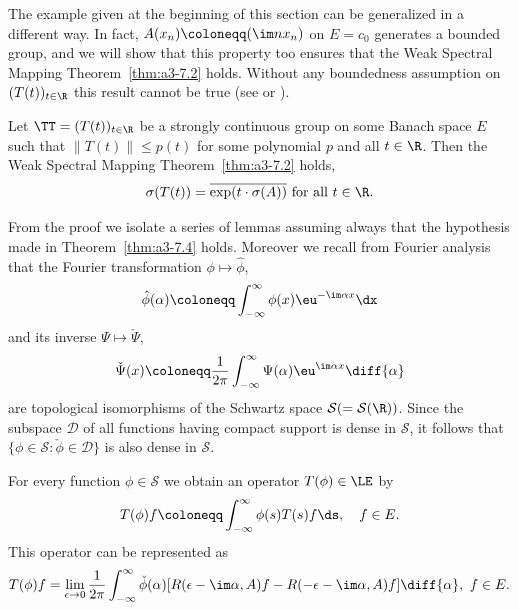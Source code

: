 The example given at the beginning of this section can be generalized in a different way.
In fact, $A(x_{n}) \coloneqq (\im nx_{n})$ on $E = c_{0}$ generates a bounded group, and we will show that this property too ensures that the Weak Spectral Mapping Theorem~\ref{thm:a3-7.2} holds.
Without any boundedness assumption on $(T(t))_{t\in\R}$ this result cannot be true (see \textcite[Sec.23.16]{hillephillips:1957} or \textcite{wolff:1981}).
\begin{theorem}\label{thm:a3-7.4}
Let $\TT = (T(t))_{t\in\R}$ be a strongly continuous group on some Banach space $E$ such that $\|T(t)\| \leq p(t)$ for some polynomial $p$ and all $t \in \R$.
Then the Weak Spectral Mapping Theorem~\ref{thm:a3-7.2} holds, \ie 
\[
\sigma(T(t)) = \overline{\exp(t\cdot\sigma(A))} \text{ for all } t \in \R .
\]
\end{theorem}
From the proof we isolate a series of lemmas assuming always that the hypothesis made in Theorem~\ref{thm:a3-7.4} holds.
Moreover we recall from Fourier analysis that the Fourier transformation $\phi \mapsto \hat{\phi}$,
\[
\hat{\phi}(\alpha) \coloneqq \int_{-\infty}^{\infty} \phi(x)\eu^{-\im\alpha x} \dx
\]
and its inverse $\Psi \mapsto \check{\Psi}$,
\[
\check{\Psi}(x) \coloneqq \frac{1}{2\pi}\int_{-\infty}^{\infty}\Psi(\alpha)\eu^{\im\alpha x} 		\diff{\alpha}
\]
are topological isomorphisms of the Schwartz space $\mathcal{S} ( = \mathcal{S}(\R))$.
Since the subspace $\mathcal{D}$ of all functions having compact support is dense in $\mathcal{S}$, it follows that $\{\phi \in \mathcal{S} \colon \check{\phi} \in \mathcal{D}\}$ is also dense in $\mathcal{S}$.
\begin{lemma}\label{lem:a3-7.5}
For every function $\phi \in \mathcal{S}$ we obtain an operator $T(\phi) \in \LE$ by
\[
T(\phi)f \coloneqq \int_{-\infty}^{\infty} \phi(s)T(s)f \ds, \quad f \in E .
\]
This operator can be represented as
\begin{equation}\label{eq:a3-7.3}
T(\phi)f = \lim_{\epsilon\to 0} \frac{1}{2\pi}\int_{-\infty}^{\infty} \check{\phi}(\alpha)[R(\epsilon-\im\alpha,A)f - R(-\epsilon-\im\alpha,A)f] \diff{\alpha}, \ f \in E .
\end{equation}
\end{lemma}
